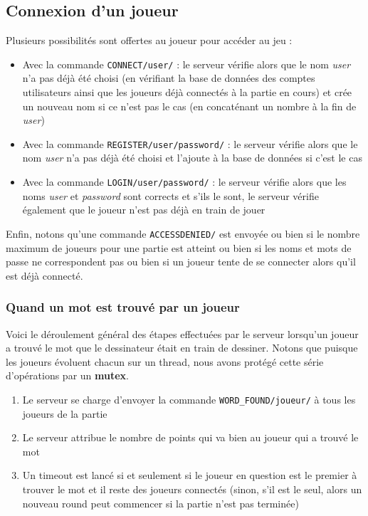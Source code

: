 \documentclass[a4paper, 11pt]{article}
\begin{document}
\subsection {Connexion d’un joueur}

Plusieurs possibilités sont offertes au joueur pour accéder au jeu :
\bigskip
\begin{itemize}
\item Avec la commande \verb+CONNECT/user/+ : le serveur vérifie alors
  que le nom \textit{user} n’a pas déjà été choisi (en vérifiant la
  base de données des comptes utilisateurs ainsi que les joueurs déjà
  connectés à la partie en cours) et crée un nouveau nom si ce n’est
  pas le cas (en concaténant un nombre à la fin de \textit{user})
\item Avec la commande \verb+REGISTER/user/password/+ : le serveur
  vérifie alors que le nom \textit{user} n’a pas déjà été choisi et
  l’ajoute à la base de données si c’est le cas
\item Avec la commande \verb+LOGIN/user/password/+ : le serveur
  vérifie alors que les noms \textit{user} et \textit{password} sont
  corrects et s’ils le sont, le serveur vérifie également que le
  joueur n’est pas déjà en train de jouer
\end{itemize}
\bigskip Enfin, notons qu’une commande \verb+ACCESSDENIED/+ est
envoyée ou bien si le nombre maximum de joueurs pour une partie est
atteint ou bien si les noms et mots de passe ne correspondent pas ou
bien si un joueur tente de se connecter alors qu’il est déjà connecté.

\subsubsection {Quand un mot est trouvé par un joueur}

Voici le déroulement général des étapes effectuées par le serveur
lorsqu’un joueur a trouvé le mot que le dessinateur était en train de
dessiner. Notons que puisque les joueurs évoluent chacun sur un
thread, nous avons protégé cette série d’opérations par un
\textbf{mutex}.

\begin{enumerate}
\item Le serveur se charge d’envoyer la commande
  \verb+WORD_FOUND/joueur/+ à tous les joueurs de la partie
\item Le serveur attribue le nombre de points qui va bien au joueur
  qui a trouvé le mot
\item Un timeout est lancé si et seulement si le joueur en question
  est le premier à trouver le mot et il reste des joueurs connectés
  (sinon, s’il est le seul, alors un nouveau round peut commencer si
  la partie n’est pas terminée)
\end{enumerate}
\end{document}

